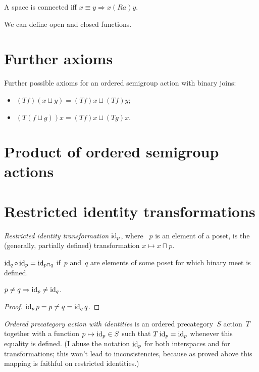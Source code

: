 A space is connected iff $x\equiv y\Rightarrow x(Ra)y$.


We can define open and closed functions.

\chapter{Further axioms}

Further possible axioms for an ordered semigroup action with binary joins:

\begin{itemize}
\item $(Tf)(x\sqcup y)=(Tf)x\sqcup(Tf)y$;
\item $(T(f\sqcup g))x=(Tf)x\sqcup(Tg)x$.
\end{itemize}


\chapter{Product of ordered semigroup actions}


\chapter{Restricted identity transformations}

\emph{Restricted identity transformation} $\operatorname{id}_p$, where ~$p$ is an element of a poset, is the (generally, partially defined) transformation $x\mapsto x\sqcap p$.

\begin{obvious}
$\operatorname{id}_q\circ\operatorname{id}_p = \operatorname{id}_{p\sqcap q}$ if~$p$ and~$q$ are elements of some poset for which binary meet is defined.
\end{obvious}

\begin{prop}
$p\ne q\Rightarrow\operatorname{id}_p\ne\operatorname{id}_q$.
\end{prop}

\begin{proof}
$\operatorname{id}_p p=p \ne q = \operatorname{id}_q q$.
\end{proof}

\emph{Ordered precategory action with identities} is an ordered precategory~$S$ action~$T$ together with a function $p\mapsto\operatorname{id}_p\in S$ such that $T\operatorname{id}_p=\operatorname{id}_p$ whenever this equality is defined. (I abuse the notation $\operatorname{id}_p$ for both interspaces and for transformations; this won't lead to inconsistencies, because as proved above this mapping is faithful on restricted identities.)

